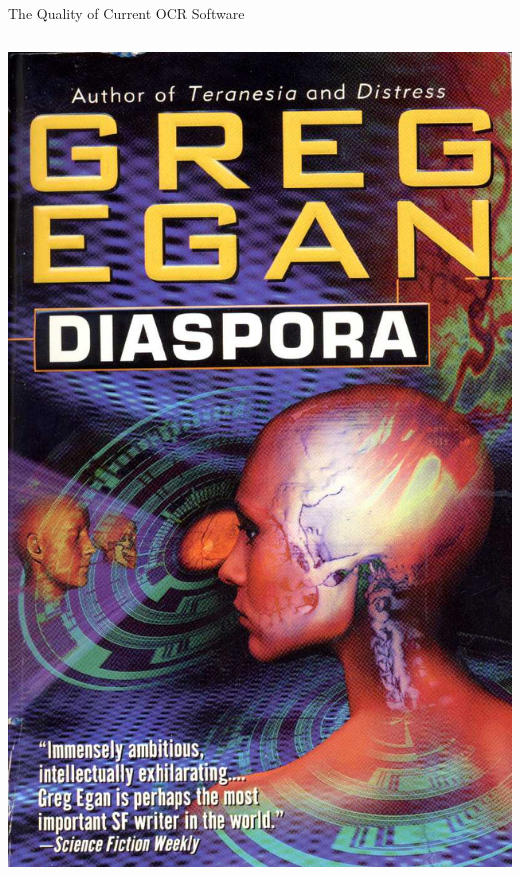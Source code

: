 \documentclass[professionalfonts, xcolor={usenames,svgnames,x11names,table}]{beamer}
\begin{document}
\begin{frame}{The Quality of Current OCR Software}
\begin{columns}
        \includegraphics[width=.9\linewidth]{./img/diaspora}
    \end{columns}
\end{frame}
\end{document}

